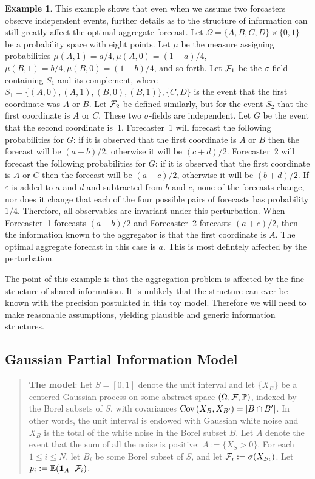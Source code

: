 \documentclass[11pt]{article}
\renewcommand{\P}{\mathbb{P}}
\newcommand{\E}{\mathbb{E}}
\theoremstyle{definition}
\newtheorem{example}[theorem]{Example}
\theoremstyle{definition}
\def\one{{\bf 1}}
\def\F{{\cal F}}
\def\P{{\mathbb P}}
\def\E{{\mathbb E}}
\def\Cov{{\rm Cov}\,}
\def\ee{\varepsilon}
\def\|{\, | \,}
\begin{document}
\begin{example}
This example shows that even when we assume two forcasters observe
independent events, further details as to the structure of information
can still greatly affect the optimal aggregate forecast.  Let 
$\Omega = \{ A,B,C,D \} \times \{ 0,1 \}$ be a probability space 
with eight points.  Let $\mu$ be the measure assigning 
probabilities $\mu (A,1) = a/4, \mu (A,0) = (1-a)/4$, 
$\mu (B,1) = b/4, \mu (B,0) = (1-b)/4$, and so forth.
Let $\F_1$ be the $\sigma$-field containing $S_1$ and its complement, 
where $S_1 = \{ (A,0),(A,1),(B,0),(B,1) \}, \{C,D \}$ is the
event that the first coordinate was $A$ or $B$.  Let $\F_2$
be defined similarly, but for the event $S_2$ that the first coordinate
is $A$ or $C$.  These two $\sigma$-fields are independent.
Let $G$ be the event that the second coordinate is~1.
Forecaster~1 will forecast the following probabilities for $G$:
if it is observed that the first coordinate is $A$ or $B$ then
the forecast will be $(a+b)/2$, otherwise it will be $(c+d)/2$.
Forecaster~2 will forecast the following probabilities for $G$:
if it is observed that the first coordinate is $A$ or $C$ then
the forecast will be $(a+c)/2$, otherwise it will be $(b+d)/2$.
If $\ee$ is added to $a$ and $d$ and subtracted from $b$ and $c$,
none of the forecasts change, nor does it change that each of
the four possible pairs of forecasts has probability $1/4$.
Therefore, all observables are invariant under this perturbation.
When Forecaster~1 forecasts $(a+b)/2$ and Forecaster~2 forecasts
$(a+c)/2$, then the information known to the aggregator is that
the first coordinate is $A$.  The optimal aggregate forecast in
this case is $a$.  This is most defintely affected by the perturbation.  
\end{example}

The point of this example is that the aggregation problem is 
affected by the fine structure of shared information.  It is
unlikely that the structure can ever be known with the precision
postulated in this toy model.  Therefore we will need to make
reasonable assumptions, yielding plausible and generic information
structures.

\subsection{Gaussian Partial Information Model}
\label{ss:Gaussian}

\begin{quote}
{\bf The model}: Let $S = [0,1]$ denote 
the unit interval and let $\{ X_B \}$ be a centered Gaussian process 
on some abstract space $(\Omega , \F , \P)$, indexed by the 
Borel subsets of $S$, with covariances $\Cov (X_B , X_{B'}) 
= |B \cap B'|$.  In other words, the unit interval is endowed
with Gaussian white noise and $X_B$ is the total of the white
noise in the Borel subset $B$.  Let $A$ denote the event that
the sum of all the noise is positive: $A := \{ X_S > 0 \}$.
For each $1 \leq i \leq N$, let $B_i$ be some Borel subset of $S$,
and let $\F_i := \sigma (X_{B_i})$.  Let $p_i := \E (\one_A \| \F_i)$.
\end{quote}
\end{document}
